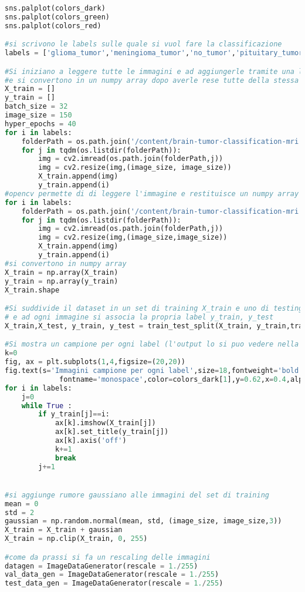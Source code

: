 \begin{lstlisting}[basicstyle=\tiny, language=Python, caption=Esempio di implementazione di AlexNet per la classificazione di RM con l'aggiunta di rumore al set di training.~\cite{dsbrain} ]
sns.palplot(colors_dark)
sns.palplot(colors_green)
sns.palplot(colors_red)

#si scrivono le labels sulle quale si vuol fare la classificazione
labels = ['glioma_tumor','meningioma_tumor','no_tumor','pituitary_tumor']

#Si iniziano a leggere tutte le immagini e ad aggiungerle tramite una lista
#e si convertono in un numpy array dopo averle rese tutte della stessa grandezza
X_train = []
y_train = []
batch_size = 32
image_size = 150 
hyper_epochs = 40
for i in labels:
    folderPath = os.path.join('/content/brain-tumor-classification-mri','Training',i)
    for j in tqdm(os.listdir(folderPath)):
        img = cv2.imread(os.path.join(folderPath,j))
        img = cv2.resize(img,(image_size, image_size))
        X_train.append(img)
        y_train.append(i)
#opencv permette di di leggere l'immagine e restituisce un numpy array
for i in labels:
    folderPath = os.path.join('/content/brain-tumor-classification-mri','Testing',i)
    for j in tqdm(os.listdir(folderPath)):
        img = cv2.imread(os.path.join(folderPath,j))
        img = cv2.resize(img,(image_size,image_size))
        X_train.append(img)
        y_train.append(i)
#si convertono in numpy array
X_train = np.array(X_train)
y_train = np.array(y_train)
X_train.shape

#Si suddivide il dataset in un set di training X_train e uno di testing X_test in maniera casuale
# e ad ogni immagine si associa la propria label y_train, y_test
X_train,X_test, y_train, y_test = train_test_split(X_train, y_train,train_size=0.9,random_state=101)

#Si mostra un campione per ogni label (l'output lo si puo vedere nella figura 5.7)
k=0
fig, ax = plt.subplots(1,4,figsize=(20,20))
fig.text(s='Immagini campione per ogni label',size=18,fontweight='bold',
             fontname='monospace',color=colors_dark[1],y=0.62,x=0.4,alpha=0.8)
for i in labels:
    j=0
    while True :
        if y_train[j]==i:
            ax[k].imshow(X_train[j])
            ax[k].set_title(y_train[j])
            ax[k].axis('off')
            k+=1
            break
        j+=1


#si aggiunge rumore gaussiano alle immagini del set di training
mean = 0
std = 2
gaussian = np.random.normal(mean, std, (image_size, image_size,3)) 
X_train = X_train + gaussian
X_train = np.clip(X_train, 0, 255)

#come da prassi si fa un rescaling delle immagini
datagen = ImageDataGenerator(rescale = 1./255)
val_data_gen = ImageDataGenerator(rescale = 1./255)
test_data_gen = ImageDataGenerator(rescale = 1./255)



\end{lstlisting}
